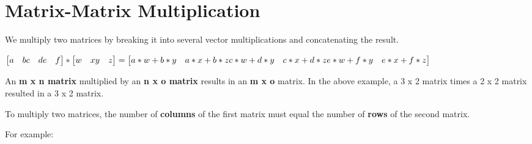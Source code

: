 \documentclass[
]{book}
\newenvironment{Shaded}{\begin{snugshade}}{\end{snugshade}}
\newcommand{\CommentTok}[1]{\textcolor[rgb]{0.56,0.35,0.01}{\textit{#1}}}
\newcommand{\FloatTok}[1]{\textcolor[rgb]{0.00,0.00,0.81}{#1}}
\newcommand{\NormalTok}[1]{#1}
\newcommand{\OperatorTok}[1]{\textcolor[rgb]{0.81,0.36,0.00}{\textbf{#1}}}
\begin{document}
\hypertarget{matrix-matrix-multiplication}{%
\section{Matrix-Matrix Multiplication}\label{matrix-matrix-multiplication}}

We multiply two matrices by breaking it into several vector multiplications and concatenating the result.

\(\begin{bmatrix} a & b \newline c & d \newline e & f \end{bmatrix} *\begin{bmatrix} w & x \newline y & z \newline \end{bmatrix} =\begin{bmatrix} a*w + b*y & a*x + b*z \newline c*w + d*y & c*x + d*z \newline e*w + f*y & e*x + f*z\end{bmatrix}\)

An \textbf{m x n matrix} multiplied by an \textbf{n x o matrix} results in an \textbf{m x o} matrix. In the above example, a 3 x 2 matrix times a 2 x 2 matrix resulted in a 3 x 2 matrix.

To multiply two matrices, the number of \textbf{columns} of the first matrix must equal the number of \textbf{rows} of the second matrix.

For example:

\begin{Shaded}
\end{Shaded}
\end{document}
